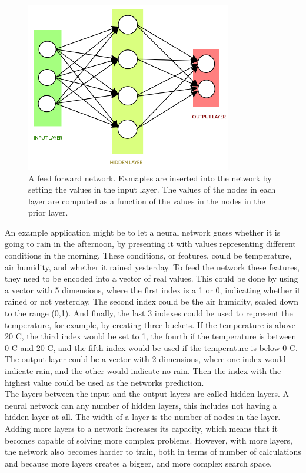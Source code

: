 \begin{figure}[htp]
	\centering
	\includegraphics[width=0.8\textwidth]{fig/neural-network.png}
	\caption{A feed forward network. Exmaples are inserted into the network by setting the values in the input layer. The values of the nodes in each layer are computed as a function of the values in the nodes in the prior layer.}
	\label{fig:neural-network}
\end{figure}

An example application might be to let a neural network guess whether it is going to rain in the afternoon, by presenting it with values representing different conditions in the morning. These conditions, or features, could be temperature, air humidity, and whether it rained yesterday. To feed the network these features, they need to be encoded into a vector of real values. This could be done by using a vector with 5 dimensions, where the first index is a 1 or 0, indicating whether it rained or not yesterday. The second index could be the air humidity, scaled down to the range (0,1). And finally, the last 3 indexes could be used to represent the temperature, for example, by creating three buckets. If the temperature is above 20 \degree C, the third index would be set to 1, the fourth if the temperature is between 0 \degree C and 20 \degree C, and the fifth index would be used if the temperature is below 0 \degree C. The output layer could be a vector with 2 dimensions, where one index would indicate rain, and the other would indicate no rain. Then the index with the highest value could be used as the networks prediction.\\

The layers between the input and the output layers are called hidden layers. A neural network can any number of hidden layers, this includes not having a hidden layer at all. The width of a layer is the number of nodes in the layer. Adding more layers to a network increases its capacity, which means that it becomes capable of solving more complex problems. However, with more layers, the network also becomes harder to train, both in terms of number of calculations and because more layers creates a bigger, and more complex search space.\\

